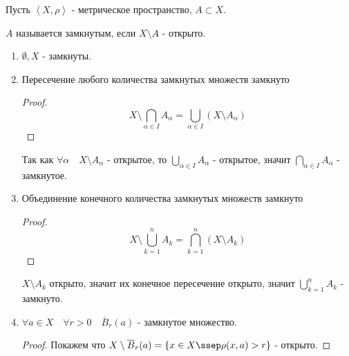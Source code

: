 \begin{definition} \thmslashn 

    Пусть $\left<X, \rho\right>$ - метрическое пространство, $A \subset X$.

    $A$ называется замкнутым, если $X \setminus A$ - открыто. 
\end{definition}
\begin{properties} \thmslashn

    \begin{enumerate}
        \item $ \emptyset, X$ - замкнуты.
        \item Пересечение любого количества замкнутых множеств замкнуто
            \begin{proof} \thmslashn
            
                \begin{equation*}
                        X \setminus \bigcap_{\alpha\in I} A_{\alpha} = \bigcup_{\alpha\in I} (X \setminus A_{\alpha}) 
                \end{equation*}
            \end{proof}

            Так как $\forall{\alpha}\quad X \setminus A_{\alpha}$ - открытое, то $\bigcup_{\alpha\in I} A_{\alpha}$ - открытое, значит $\bigcap_{\alpha\in I} A_{\alpha}$ - замкнутое.

        \item Объединение конечного количества замкнутых множеств замкнуто
            \begin{proof} \thmslashn
            
                \begin{equation*}
                    X \setminus \bigcup_{k = 1}^{n} A_{k} = \bigcap_{k = 1}^{n} (X \setminus A_{k})
                \end{equation*}
            \end{proof}

            $X \setminus A_{k}$ открыто, значит их конечное пересечение открыто, значит $\bigcup_{k=1}^{n} A_{k}$ - замкнуто.
        \item $\forall{a\in X}\quad \forall{r > 0}\quad \overline{B}_{r}(a)$ - замкнутое множество.
            \begin{proof} \thmslashn
            
                Покажем что $X \setminus \overline{B}_{r}(a) = \{x\in X \ssep \rho(x, a) > r\} $ - открыто.


\end{proof}
\end{enumerate}
\end{properties}
